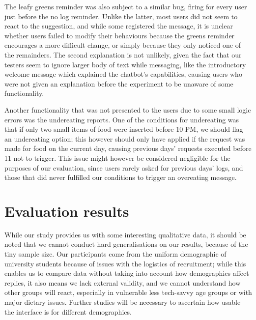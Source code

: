 The leafy greens reminder was also subject to a similar bug, firing for every user just before the no log reminder. Unlike the latter, most users did not seem to react to the suggestion, and while some registered the message, it is unclear whether users failed to modify their behaviours because the greens reminder encourages a more difficult change, or simply because they only noticed one of the remainders. The second explanation is not unlikely, given the fact that our testers seem to ignore larger body of text while messaging, like the introductory welcome message which explained the chatbot's capabilities, causing users who were not given an explanation before the experiment to be unaware of some functionality. 

Another functionality that was not presented to the users due to some small logic errors was the undereating reports. One of the conditions for undereating was that if only two small items of food were inserted before 10 PM, we should flag an undereating option; this however should only have applied if the request was made for food on the current day, causing previous days' requests executed before 11 not to trigger. This issue might however be considered negligible for the purposes of our evaluation, since users rarely asked for previous days' logs, and those that did never fulfilled our conditions to trigger an overeating message.
\section{Evaluation results}
While our study provides us with some interesting qualitative data, it should be noted that we cannot conduct hard generalisations on our results, because of the tiny sample size. Our participants come from the uniform demographic of university students because of issues with the logistics of recruitment; while this enables us to compare data without taking into account how demographics affect replies, it also means we lack external validity, and we cannot understand how other groups will react, especially in vulnerable less tech-savvy age groups or with major dietary issues. Further studies will be necessary to ascertain how usable the interface is for different demographics. 

